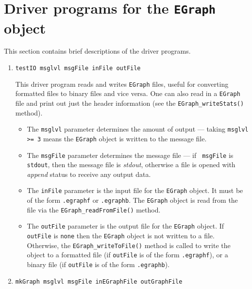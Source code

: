 \par
\section{Driver programs for the {\tt EGraph} object}
\label{section:EGraph:drivers}
\par
This section contains brief descriptions of the driver programs.
\par
\begin{enumerate}
\item
\begin{verbatim}
testIO msglvl msgFile inFile outFile
\end{verbatim}
This driver program reads and writes {\tt EGraph} files, useful for
converting formatted files to binary files and vice versa.
One can also read in a {\tt EGraph} file and print out just the 
header information (see the {\tt EGraph\_writeStats()} method).
\par
\begin{itemize}
\item
The {\tt msglvl} parameter determines the amount of output ---
taking {\tt msglvl >= 3} means the {\tt EGraph} object is written
to the message file.
\item
The {\tt msgFile} parameter determines the message file --- if {\tt
msgFile} is {\tt stdout}, then the message file is {\it stdout},
otherwise a file is opened with {\it append} status to receive any
output data.
\item
The {\tt inFile} parameter is the input file for the {\tt EGraph}
object. It must be of the form {\tt *.egraphf} or {\tt *.egraphb}.
The {\tt EGraph} object is read from the file via the
{\tt EGraph\_readFromFile()} method.
\item
The {\tt outFile} parameter is the output file for the {\tt EGraph}
object. 
If {\tt outFile} is {\tt none} then the {\tt EGraph} object is not
written to a file. 
Otherwise, the {\tt EGraph\_writeToFile()} method is called to write
the object to 
a formatted file (if {\tt outFile} is of the form {\tt *.egraphf}),
or
a binary file (if {\tt outFile} is of the form {\tt *.egraphb}).
\end{itemize}
\item
\begin{verbatim}
mkGraph msglvl msgFile inEGraphFile outGraphFile 

\end{verbatim}
\end{enumerate}
